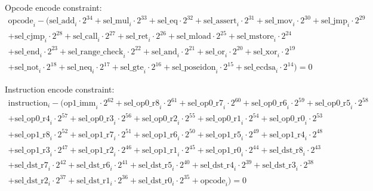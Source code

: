 Opcode encode constraint:
\begin{multline*}
    \mathrm{opcode}_i - (\mathrm{sel\_add}_i \cdot 2^{34} + \mathrm{sel\_mul}_i \cdot 2^{33} + \mathrm{sel\_eq} \cdot 2^{32} + \mathrm{sel\_assert}_i \cdot 2^{31} + \mathrm{sel\_mov}_i \cdot 2^{30} + \mathrm{sel\_jmp}_i \cdot 2^{29} \\
    + \mathrm{sel\_cjmp}_i \cdot 2^{28} + \mathrm{sel\_call}_i \cdot 2^{27} + \mathrm{sel\_ret}_i \cdot 2^{26} + \mathrm{sel\_mload} \cdot 2^{25} + \mathrm{sel\_mstore}_i \cdot 2^{24} \\
    + \mathrm{sel\_end}_i  \cdot 2^{23} + \mathrm{sel\_range\_check}_i \cdot 2^{22} + \mathrm{sel\_and}_i \cdot 2^{21} + \mathrm{sel\_or}_i \cdot 2^{20} + \mathrm{sel\_xor}_i \cdot 2^{19} \\
    + \mathrm{sel\_not}_i \cdot 2^{18} + \mathrm{sel\_neq}_i \cdot 2^{17} + \mathrm{sel\_gte}_i \cdot 2^{16} + \mathrm{sel\_poseidon}_i \cdot 2^{15} + \mathrm{sel\_ecdsa}_i \cdot 2^{14}) = 0
\end{multline*}

Instruction encode constraint:
\begin{multline*}
    \mathrm{instruction}_i - (\mathrm{op1\_imm}_i \cdot 2^{62} + \mathrm{sel\_op0\_r8}_i \cdot 2^{61} + \mathrm{sel\_op0\_r7}_i \cdot 2^{60} + \mathrm{sel\_op0\_r6}_i \cdot 2^{59} + \mathrm{sel\_op0\_r5}_i \cdot 2^{58} \\
    + \mathrm{sel\_op0\_r4}_i \cdot 2^{57} + \mathrm{sel\_op0\_r3}_i \cdot 2^{56} + \mathrm{sel\_op0\_r2}_i \cdot 2^{55} + \mathrm{sel\_op0\_r1}_i \cdot 2^{54} + \mathrm{sel\_op0\_r0}_i \cdot 2^{53} \\
    + \mathrm{sel\_op1\_r8}_i \cdot 2^{52} + \mathrm{sel\_op1\_r7}_i \cdot 2^{51} + \mathrm{sel\_op1\_r6}_i \cdot 2^{50} + \mathrm{sel\_op1\_r5}_i \cdot 2^{49} + \mathrm{sel\_op1\_r4}_i \cdot 2^{48} \\
    + \mathrm{sel\_op1\_r3}_i \cdot 2^{47} + \mathrm{sel\_op1\_r2}_i \cdot 2^{46} + \mathrm{sel\_op1\_r1}_i \cdot 2^{45} + \mathrm{sel\_op1\_r0}_i \cdot 2^{44} + \mathrm{sel\_dst\_r8}_i \cdot 2^{43} \\
    + \mathrm{sel\_dst\_r7}_i \cdot 2^{42} + \mathrm{sel\_dst\_r6}_i \cdot 2^{41} + \mathrm{sel\_dst\_r5}_i \cdot 2^{40} + \mathrm{sel\_dst\_r4}_i \cdot 2^{39} + \mathrm{sel\_dst\_r3}_i \cdot 2^{38} \\
    + \mathrm{sel\_dst\_r2}_i \cdot 2^{37} + \mathrm{sel\_dst\_r1}_i \cdot 2^{36} + \mathrm{sel\_dst\_r0}_i \cdot 2^{35} + \mathrm{opcode}_i) = 0
\end{multline*}

